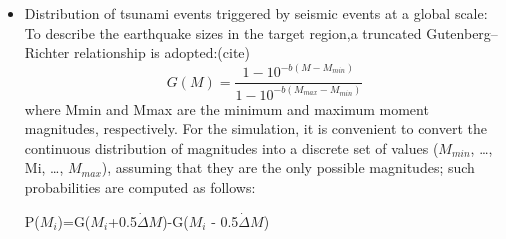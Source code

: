 \documentclass{article}
\begin{document}
\begin{itemize}
\begin{itemize}
The probability of system failure given that C has failed is evaluated
as:\\ \vspace{5mm}
\hspace{15mm}P(S/A,$\Bar{B}$,$\Bar{B}$) = P(S/A,$\Bar{B}$,$\Bar{B}$,D) P(D) + P(S/A,$\Bar{B}$,$\Bar{C}$,$\Bar{D}$) P($\Bar{B}$). \hspace{30mm} (6) \\
We know if that B,C,D fails then the entire system fails. \\
\\ \vspace{2mm}
\hspace{15mm}$\therefore$ P(S/A,$\Bar{B}$,$\Bar{C}$,$\Bar{D}$)=1 \\
Similarly , calculating for E,\\ \vspace{5mm}
\hspace{15mm}\textbf{P(S/A) = [1-P(E)P(D) ] [1-P(C) ] [1-P(B)]}\\

P(S/$\Bar{A}$) can be calculated in the above fashion and it boils down to : \\ \vspace{5mm}
\hspace{15mm}\textbf{P(S/$\Bar{A}$) - [ 1-P(E) P(D)] [l-P(C)]}\\\vspace{5mm}
System failure probability is thus given by :\\\vspace{2mm}
\hspace{15mm} \textbf{P(S) = [1-P(E)P(D)] [1-P(C)][1-P(A)P(B)]}\\
\\
DATA TO BE ADDED YET ACCORDING TO TIME PERIOD.
    \newpage
    \item Distribution of tsunami events triggered by seismic events at a global scale:\\ 
    To describe the earthquake sizes in the target region,a truncated Gutenberg–Richter relationship is adopted:(cite) %
    $$G(M)=\frac{1-10^{-b(M-M_{min})}}{1-10^{-b(M_{max}-M_{min})}}$$
    where Mmin and Mmax are the minimum and maximum moment magnitudes, respectively.
    For the simulation, it is convenient to convert the continuous distribution of magnitudes into a discrete set of values ($M_{min}$, …, Mi, …, $M_{max}$), assuming that they are the only possible magnitudes; such probabilities are computed as follows:\\
    \begin{center}
        P($M_{i}$)=G($M_{i}$+0.5$ \dot \Delta M$)-G($M_{i}$ - 0.5$ \dot \Delta M$)
    \end{center}
    

\end{itemize}
\end{itemize}
\end{document}
